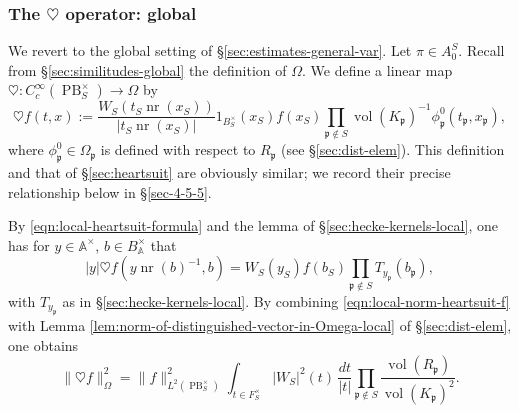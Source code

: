 \documentclass[reqno,10pt]{amsart}
\theoremstyle{plain} %
\theoremstyle{definition}
\theoremstyle{plain} %
\theoremstyle{remark}
\theoremstyle{itplain} %
\theoremstyle{remark} %
\numberwithin{equation}{section}
\def\PB{\operatorname{PB}}
\DeclareMathOperator{\vol}{vol}
\DeclareMathOperator{\nr}{nr}
\begin{document}
\subsubsection{The $\heartsuit$ operator: global\label{sec:heartsuit-global}}
\label{sec-3-6}
We revert to the global setting of \S\ref{sec:estimates-general-var}.
Let $\pi \in A_0^S$.
Recall from \S\ref{sec:similitudes-global} the definition of $\Omega$.  We define a linear map $\heartsuit : C_c^\infty(\PB^\times_S) \rightarrow \Omega$ by
\[
  \heartsuit f(t,x) := \frac{W_S(t_S \nr(x_S))}{|t_S \nr(x_S)|} 1_{B_S^\times}(x_S) f(x_S) \prod_{\mathfrak{p} \notin S} \vol(K_{\mathfrak{p}})^{-1} \phi_\mathfrak{p}^0(t_\mathfrak{p},x_\mathfrak{p}),
\]
where $\phi_\mathfrak{p}^0 \in \Omega_\mathfrak{p}$ is defined with respect to $R_\mathfrak{p}$ (see \S\ref{sec:dist-elem}).  This definition and that of \S\ref{sec:heartsuit} are obviously similar; we record their precise relationship below in \S\ref{sec-4-5-5}.

By \eqref{eqn:local-heartsuit-formula} and the lemma of \S\ref{sec:hecke-kernels-local}, one has for $y \in \mathbb{A}^\times$, $b \in B_\mathbb{A}^\times$ that
\begin{equation}\label{eqn:formulas-for-heartsuit-f-global}
  |y| \heartsuit f(
  y \nr(b)^{-1}, b)
  =
  W_S(y_S) f(b_S)
  \prod_{\mathfrak{p} \notin S}
  T_{y_\mathfrak{p}}(b_\mathfrak{p}),
\end{equation}
with $T_{y_\mathfrak{p}}$ as in \S\ref{sec:hecke-kernels-local}.  By combining \eqref{eqn:local-norm-heartsuit-f} with Lemma \ref{lem:norm-of-distinguished-vector-in-Omega-local} of \S\ref{sec:dist-elem}, one obtains
\begin{equation}\label{eqn:norm-of-heartsuit-f-global}
  \|\heartsuit f\|^2_{\Omega}
  =
  \|f\|_{L^2(\PB^\times_S)}^2
  \int_{t \in F_S^\times}
  |W_S|^2(t)
  \, \frac{d t}{|t|}
  \prod_{\mathfrak{p} \notin S}
  \frac{\vol(R_\mathfrak{p})}{\vol(K_\mathfrak{p})^2}.
\end{equation}
\end{document}
